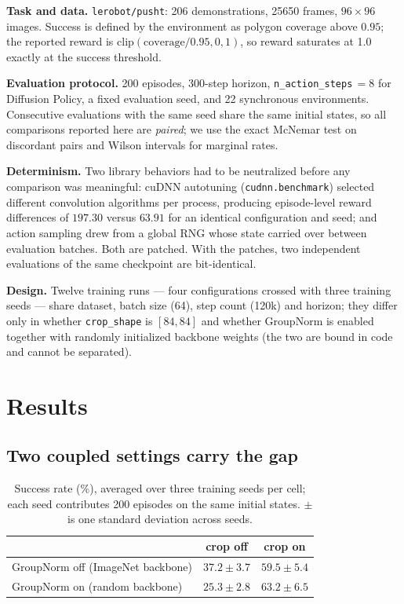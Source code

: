 \documentclass[11pt]{article}
\begin{document}
\textbf{Task and data.} \texttt{lerobot/pusht}: 206 demonstrations, 25650 frames,
$96\times96$ images. Success is defined by the environment as polygon coverage
above $0.95$; the reported reward is $\mathrm{clip}(\text{coverage}/0.95, 0, 1)$,
so reward saturates at 1.0 exactly at the success threshold.

\textbf{Evaluation protocol.} 200 episodes, 300-step horizon,
\texttt{n\_action\_steps}$\,=8$ for Diffusion Policy, a fixed evaluation seed, and
22 synchronous environments. Consecutive evaluations with the same seed share the
same initial states, so all comparisons reported here are \emph{paired}; we use the
exact McNemar test on discordant pairs and Wilson intervals for marginal rates.

\textbf{Determinism.} Two library behaviors had to be neutralized before any
comparison was meaningful: cuDNN autotuning (\texttt{cudnn.benchmark}) selected
different convolution algorithms per process, producing episode-level reward
differences of $197.30$ versus $63.91$ for an identical configuration and seed;
and action sampling drew from a global RNG whose state carried over between
evaluation batches. Both are patched. With the patches, two independent evaluations
of the same checkpoint are bit-identical.

\textbf{Design.} Twelve training runs --- four configurations crossed with three
training seeds --- share dataset, batch size (64), step count (120k) and horizon;
they differ only in whether \texttt{crop\_shape} is $[84,84]$ and whether GroupNorm
is enabled together with randomly initialized backbone weights (the two are bound
in code and cannot be separated).

\section{Results}

\subsection{Two coupled settings carry the gap}
\label{sec:factorial}

\begin{table}[t]
\centering
\caption{Success rate (\%), averaged over three training seeds per cell; each
seed contributes 200 episodes on the same initial states. $\pm$ is one standard
deviation across seeds.}
\label{tab:factorial}
\begin{tabular}{lcc}
\toprule
 & crop off & crop on \\
\midrule
GroupNorm off (ImageNet backbone) & $37.2\pm3.7$ & $59.5\pm5.4$ \\
GroupNorm on (random backbone)    & $25.3\pm2.8$ & $\mathbf{63.2\pm6.5}$ \\
\bottomrule
\end{tabular}
\end{table}
\end{document}
